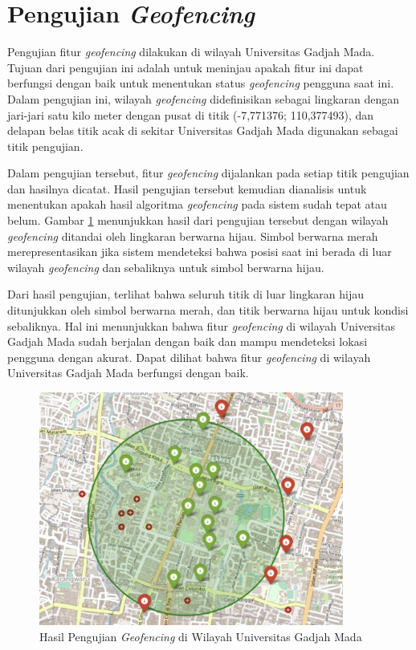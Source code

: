 \section{Pengujian \textit{Geofencing}}
Pengujian fitur \textit{geofencing} dilakukan di wilayah Universitas Gadjah Mada. Tujuan dari pengujian ini adalah untuk meninjau apakah fitur ini dapat berfungsi dengan baik untuk menentukan status \textit{geofencing} pengguna saat ini. Dalam pengujian ini, wilayah \textit{geofencing} didefinisikan sebagai lingkaran dengan jari-jari satu kilo meter dengan pusat di titik (-7,771376; 110,377493), dan delapan belas titik acak di sekitar Universitas Gadjah Mada digunakan sebagai titik pengujian.

Dalam pengujian tersebut, fitur \textit{geofencing} dijalankan pada setiap titik pengujian dan hasilnya dicatat. Hasil pengujian tersebut kemudian dianalisis untuk menentukan apakah hasil algoritma \textit{geofencing} pada sistem sudah tepat atau belum. Gambar \ref{Fig: geofencing-1} menunjukkan hasil dari pengujian tersebut dengan wilayah \textit{geofencing} ditandai oleh lingkaran berwarna hijau. Simbol berwarna merah merepresentasikan jika sistem mendeteksi bahwa posisi saat ini berada di luar wilayah \textit{geofencing} dan sebaliknya untuk simbol berwarna hijau.

Dari hasil pengujian, terlihat bahwa seluruh titik di luar lingkaran hijau ditunjukkan oleh simbol berwarna merah, dan titik berwarna hijau untuk kondisi sebaliknya. Hal ini menunjukkan bahwa fitur \textit{geofencing} di wilayah Universitas Gadjah Mada sudah berjalan dengan baik dan mampu mendeteksi lokasi pengguna dengan akurat. Dapat dilihat bahwa fitur \textit{geofencing} di wilayah Universitas Gadjah Mada berfungsi dengan baik.

\begin{figure}[H]
	\centering
	\includegraphics[width=10cm]{contents/chapter-4/geofencing/wilayah-ugm.jpg}
	\caption{Hasil Pengujian \textit{Geofencing} di Wilayah Universitas Gadjah Mada}
	\label{Fig: geofencing-1}
\end{figure}

